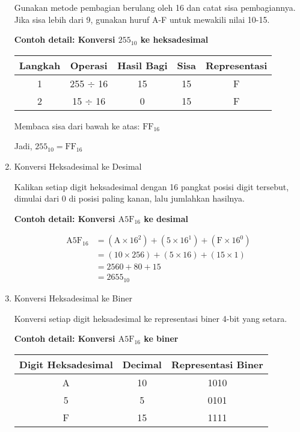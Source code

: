 \begin{enumerate}
Gunakan metode pembagian berulang oleh 16 dan catat sisa pembagiannya. Jika sisa lebih dari 9, gunakan huruf A-F untuk mewakili nilai 10-15.

\textbf{Contoh detail: Konversi \(255_{10}\) ke heksadesimal}

\begin{center}
\begin{tabular}{|c|c|c|c|c|}
\hline
\textbf{Langkah} & \textbf{Operasi} & \textbf{Hasil Bagi} & \textbf{Sisa} & \textbf{Representasi} \\
\hline
1 & 255 $\div$ 16 & 15 & 15 & F \\
2 & 15 $\div$ 16 & 0 & 15 & F \\
\hline
\end{tabular}
\end{center}

Membaca sisa dari bawah ke atas: \(\mathrm{FF}_{16}\)

Jadi, \(255_{10} = \mathrm{FF}_{16}\)

\item{Konversi Heksadesimal ke Desimal}

Kalikan setiap digit heksadesimal dengan 16 pangkat posisi digit tersebut, dimulai dari 0 di posisi paling kanan, lalu jumlahkan hasilnya.

\textbf{Contoh detail: Konversi \(\mathrm{A5F}_{16}\) ke desimal}

\begin{align*}
\mathrm{A5F}_{16} &= (\mathrm{A} \times 16^2) + (5 \times 16^1) + (\mathrm{F} \times 16^0) \\
&= (10 \times 256) + (5 \times 16) + (15 \times 1) \\
&= 2560 + 80 + 15 \\
&= 2655_{10}
\end{align*}

\item{Konversi Heksadesimal ke Biner}

Konversi setiap digit heksadesimal ke representasi biner 4-bit yang setara.

\textbf{Contoh detail: Konversi \(\mathrm{A5F}_{16}\) ke biner}

\begin{center}
\begin{tabular}{|c|c|c|}
\hline
\textbf{Digit Heksadesimal} & \textbf{Decimal} & \textbf{Representasi Biner} \\
\hline
A & 10 & 1010 \\
5 & 5 & 0101 \\
F & 15 & 1111 \\
\hline
\end{tabular}
\end{center}


\end{enumerate}

